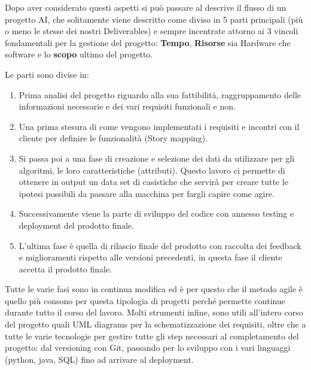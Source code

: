 \documentclass{article}
\begin{document}
 Dopo aver considerato questi aspetti si può passare al descrive il flusso di un progetto AI, che solitamente viene descritto come diviso in 5 parti principali (più o meno le stesse dei nostri Deliverables) e sempre incentrate attorno ai 3 vincoli fondamentali per la gestione del progetto: \textbf{Tempo}, \textbf{Risorse} sia Hardware che software e lo \textbf{scopo} ultimo del progetto.

 Le parti sono divise in:
\begin{enumerate}
    \item Prima analisi del progetto riguardo alla sua fattibilità, raggruppamento delle informazioni necessarie e dei vari requisiti funzionali e non.
    \item Una prima stesura di come vengono implementati i requisiti e incontri con il cliente per definire le funzionalità (Story mapping).
    \item Si passa poi a una fase di creazione e selezione dei dati da utilizzare per gli algoritmi, le loro caratteristiche (attributi).
    Questo lavoro ci permette di ottenere in output un data set di casistiche che servirà per creare tutte le ipotesi possibili da passare alla macchina per fargli capire come agire.
    \item Successivamente viene la parte di sviluppo del codice con annesso testing e deployment del prodotto finale.
    \item L'ultima fase è quella di rilascio finale del prodotto con raccolta dei feedback e miglioramenti rispetto alle versioni precedenti, in questa fase il cliente accetta il prodotto finale.     
\end{enumerate}

Tutte le varie fasi sono in continua modifica ed è per questo che il metodo agile è quello più consono per questa tipologia di progetti perché permette continue durante tutto il corso del lavoro.
Molti strumenti infine, sono utili all'intero corso del progetto quali UML diagrams per la schematizzazione dei requisiti, oltre che a tutte le varie tecnologie per gestire tutte gli step necessari al completamento del progetto: dal versioning con Git, passando per lo sviluppo con i vari linguaggi (python, java, SQL) fino ad arrivare al deployment.
\\
\end{document}
